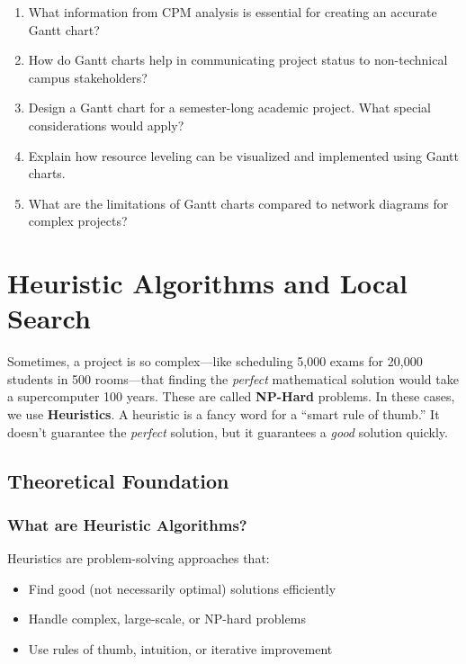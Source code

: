 \documentclass[
  letterpaper,
  DIV=11,
  numbers=noendperiod]{scrreprt}
\providecommand{\tightlist}{%
  \setlength{\itemsep}{0pt}\setlength{\parskip}{0pt}}
\begin{document}
\begin{enumerate}
\def\labelenumi{\arabic{enumi}.}
\item
  What information from CPM analysis is essential for creating an
  accurate Gantt chart?
\item
  How do Gantt charts help in communicating project status to
  non-technical campus stakeholders?
\item
  Design a Gantt chart for a semester-long academic project. What
  special considerations would apply?
\item
  Explain how resource leveling can be visualized and implemented using
  Gantt charts.
\item
  What are the limitations of Gantt charts compared to network diagrams
  for complex projects?
\end{enumerate}

\section{Heuristic Algorithms and Local
Search}\label{heuristic-algorithms-and-local-search}

Sometimes, a project is so complex---like scheduling 5,000 exams for
20,000 students in 500 rooms---that finding the \emph{perfect}
mathematical solution would take a supercomputer 100 years. These are
called \textbf{NP-Hard} problems. In these cases, we use
\textbf{Heuristics}. A heuristic is a fancy word for a ``smart rule of
thumb.'' It doesn't guarantee the \emph{perfect} solution, but it
guarantees a \emph{good} solution quickly.

\subsection{Theoretical Foundation}\label{theoretical-foundation-7}

\subsubsection{What are Heuristic
Algorithms?}\label{what-are-heuristic-algorithms}

Heuristics are problem-solving approaches that:

\begin{itemize}
\tightlist
\item
  Find good (not necessarily optimal) solutions efficiently
\item
  Handle complex, large-scale, or NP-hard problems
\item
  Use rules of thumb, intuition, or iterative improvement
\end{itemize}
\end{document}
